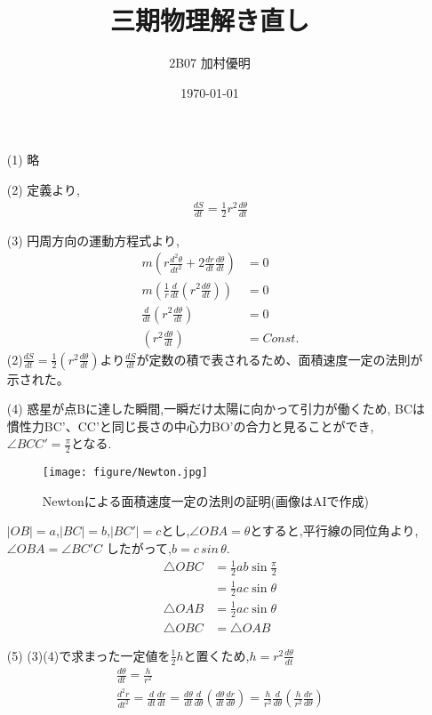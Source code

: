 \documentclass{jsarticle}
\title{三期物理解き直し}
\date{\today}
\author{2B07 加村優明}
\begin{document}
\maketitle

  \begin{itemize}
  \item[(1)] 略
  \item[(2)] 定義より,
  \begin{align*}
    \frac{dS}{dt} = \frac{1}{2}r^2\frac{d\theta}{dt}
  \end{align*}
  \item[(3)] 円周方向の運動方程式より,  
  \begin{align*}
    m(r \frac{d^2\theta }{dt^2} + 2\frac{dr}{dt}\frac{d \theta}{dt}) &= 0\\
    m(\frac{1}{r}\frac{d}{dt}(r^2 \frac{d \theta}{dt})) &= 0\\
    \frac{d}{dt}(r^2 \frac{d \theta}{dt}) &= 0\\
    (r^2 \frac{d \theta}{dt}) &= Const.
    \end{align*}
  (2)$\frac{dS}{dt}=\frac{1}{2}(r^2 \frac{d \theta}{dt}) $より$\frac{dS}{dt}$が定数の積で表されるため、面積速度一定の法則が示された。
  \item[(4)] 惑星が点Bに達した瞬間,一瞬だけ太陽に向かって引力が働くため,
  BCは慣性力BC'、CC'と同じ長さの中心力BO'の合力と見ることができ,$\angle BCC'=\frac{\pi}{2}$となる.
  \begin{figure}[b]
    \centering
    \texttt{[image: figure/Newton.jpg]}
    \caption{Newtonによる面積速度一定の法則の証明(画像はAIで作成)}
    \label{fig:1}
  \end{figure}
  $|OB|=a$,$|BC|=b$,$|BC'|=c$とし,$\angle OBA=\theta$とすると,平行線の同位角より,$\angle OBA = \angle BC'C$
  したがって,$b=c\,sin\,\theta$.
  \begin{align*}
    \triangle OBC &=\frac{1}{2}ab \sin\frac{\pi}{2}\\
                  &=\frac{1}{2}ac \sin\theta\\
    \triangle OAB &=\frac{1}{2}ac \sin\theta\\ 
    \triangle OBC &=\triangle OAB            
  \end{align*}  
  \item[(5)](3)(4)で求まった一定値を$\frac{1}{2}h$と置くため,$h = r^2 \frac{d \theta}{dt}$   
  \begin{align*}
    \frac{d\theta}{dt} = \frac{h}{r^2}\\
    \frac{d^2r}{dt^2} = \frac{d}{dt}\frac{dr}{dt} = \frac{d\theta}{dt}\frac{d}{d\theta}(\frac{d\theta}{dt}\frac{dr}{d\theta}) = \frac{h}{r^2}\frac{d}{d\theta}(\frac{h}{r^2}\frac{dr}{d\theta})\\

\end{align*}
\end{itemize}
\end{document}
